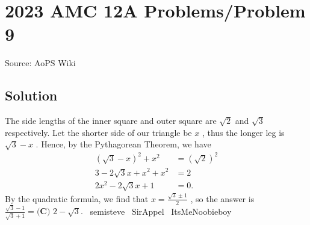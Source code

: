 \documentclass[12pt]{article}
\begin{document}
\section*{{2023 AMC 12A Problems/Problem 9}}
Source: AoPS Wiki

\subsection*{Solution}
The side lengths of the inner square and outer square are $\sqrt{2}$ and $\sqrt{3}$ respectively. Let the shorter side of our triangle be $x$ , thus the longer leg is $\sqrt{3}-x$ .
Hence, by the Pythagorean Theorem, we have \begin{align*} (\sqrt{3}-x)^2+x^2&=(\sqrt{2})^2 \\ 3-2\sqrt{3}x+x^2+x^2&=2 \\ 2x^2-2\sqrt{3}x+1&=0. \end{align*} By the quadratic formula, we find that $x=\frac{\sqrt{3}\pm1}{2}$ , so the answer is $\frac{\sqrt{3}-1}{\sqrt{3}+1}=\boxed{\textbf{(C) }2-\sqrt3}.$ ~semisteve
~SirAppel
~ItsMeNoobieboy
\end{document}
